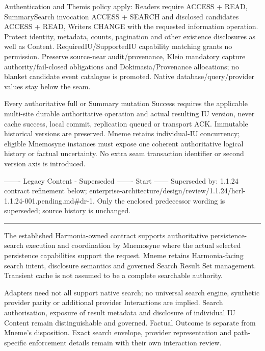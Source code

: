 Authentication and Themis policy apply: Readers require ACCESS + READ, SummarySearch invocation ACCESS + SEARCH and disclosed candidates ACCESS + READ, Writers CHANGE with the requested information operation. Protect identity, metadata, counts, pagination and other existence disclosures as well as Content. RequiredIU/SupportedIU capability matching grants no permission. Preserve source-near audit/provenance, Kleio mandatory capture authority/fail-closed obligations and Dokimasia/Provenance allocations; no blanket candidate event catalogue is promoted. Native database/query/provider values stay below the seam.



Every authoritative full or Summary mutation Success requires the applicable multi-site durable authoritative operation and actual resulting IU version, never cache success, local commit, replication queued or transport ACK. Immutable historical versions are preserved. Mneme retains individual-IU concurrency; eligible Mnemosyne instances must expose one coherent authoritative logical history or factual uncertainty. No extra seam transaction identifier or second version axis is introduced.



------- Legacy Content - Superseded ------- Start ------
Superseded by: 1.1.24 contract refinement below; enterprise-architecture/design/review/1.1.24/hcrl-1.1.24-001.pending.md\#dr-1.
Only the enclosed predecessor wording is superseded; source history is unchanged.



\medskip\hrule\medskip


The established Harmonia-owned contract supports authoritative persistence-search execution and coordination by Mnemosyne where the actual selected persistence capabilities support the request. Mneme retains Harmonia-facing search intent, disclosure semantics and governed Search Result Set management. Transient cache is not assumed to be a complete searchable authority.



Adapters need not all support native search; no universal search engine, synthetic provider parity or additional provider Interactions are implied. Search authorisation, exposure of result metadata and disclosure of individual IU Content remain distinguishable and governed. Factual Outcome is separate from Mneme's disposition. Exact search envelope, provider representation and path-specific enforcement details remain with their own interaction review.



